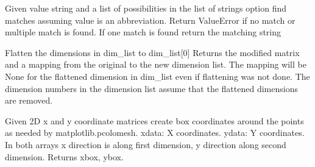 \documentclass[letterpaper,10pt,english]{sphinxmanual}
\begin{document}

\begin{fulllineitems}
\label{\detokenize{tools:flap.tools.find_str_match}}
Given value string and a list of possibilities in the list of strings option
find matches assuming value is an abbreviation. Return ValueError if no match
or multiple match is found.
If one match is found return the matching string

\end{fulllineitems}


\begin{fulllineitems}
\label{\detokenize{tools:flap.tools.flatten_multidim}}
Flatten the dimensions in dim\_list to dim\_list{[}0{]}
Returns the modified matrix and a mapping from the original to the new dimension list.
The mapping will be None for the flattened dimension in dim\_list even if
flattening was not done. The dimension numbers in the dimension list assume that
the flattened dimensions are removed.

\end{fulllineitems}


\begin{fulllineitems}
\label{\detokenize{tools:flap.tools.grid_to_box}}
Given 2D x and y coordinate matrices create box coordinates around the points as
needed by matplotlib.pcolomesh.
xdata: X coordinates.
ydata: Y coordinates.
In both arrays x direction is along first dimension, y direction along second dimension.
Returns xbox, ybox.

\end{fulllineitems}

\end{document}
